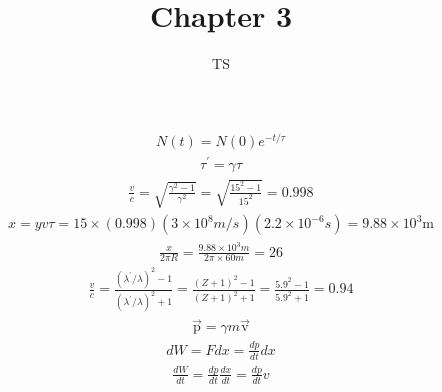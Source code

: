 \documentclass[12pt]{article}
\begin{document}
\author{TS}
\title{Chapter 3}
\maketitle
\begin{align}
N ( t ) = N ( 0 ) e ^ { - t / \tau }
\end{align}
\begin{align}
\tau ^ { \prime } = \gamma \tau
\end{align}
\begin{align}
\frac { v } { c } = \sqrt { \frac { \gamma ^ { 2 } - 1 } { \gamma ^ { 2 } } } = \sqrt { \frac { 15 ^ { 2 } - 1 } { 15 ^ { 2 } } } = 0.998
\end{align}
\begin{align}
x = y v \tau = 15 \times ( 0.998 ) \left( 3 \times 10 ^ { 8 } m / s \right) \left( 2.2 \times 10 ^ { - 6 } s \right) = 9.88 \times 10 ^ { 3 } \mathrm { m }
\end{align}
\begin{align}
\frac { x } { 2 \pi R } = \frac { 9.88 \times 10 ^ { 3 } m } { 2 \pi \times 60 m } = 26
\end{align}
\begin{align}
\frac { v } { c } = \frac { \left( \lambda ^ { \prime } / \lambda \right) ^ { 2 } - 1 } { \left( \lambda ^ { \prime } / \lambda \right) ^ { 2 } + 1 } = \frac { ( Z + 1 ) ^ { 2 } - 1 } { ( Z + 1 ) ^ { 2 } + 1 } = \frac { 5.9 ^ { 2 } - 1 } { 5.9 ^ { 2 } + 1 } = 0.94
\end{align}
\begin{align}
\vec { \mathrm { p } } = \gamma m \vec { \mathrm { v } }
\end{align}
\begin{align}
d W = F d x = \frac { d p } { d t } d x
\end{align}
\begin{align}
\frac { d W } { d t } = \frac { d p } { d t } \frac { d x } { d t } = \frac { d p } { d t } v
\end{align}
\end{document}
